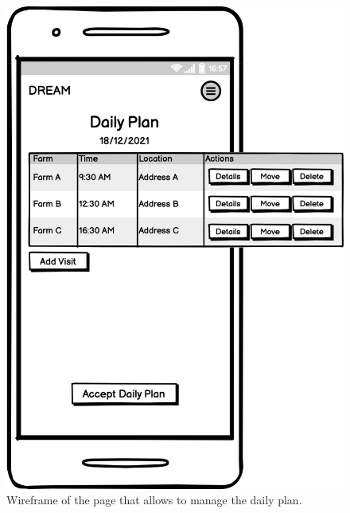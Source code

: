 \documentclass{article}
\begin{document}
\begin{figure}[H]
    \centering
    \includegraphics[scale=0.15]{wireframes/dailyplan.png}
    \caption{Wireframe of the page that allows to manage the daily plan.}
\end{figure}
\end{document}

